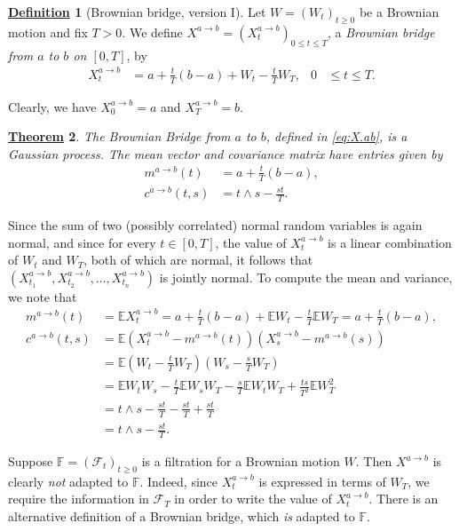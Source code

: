 \documentclass[12pt]{book}
\numberwithin{equation}{chapter}
\theoremstyle{plain}
\newtheorem{theorem}{\underline{Theorem}}
\numberwithin{theorem}{section}
\theoremstyle{definition}
\newtheorem{definition}[theorem]{\underline{Definition}}
\numberwithin{exercise}{chapter}
\let\oldendproof\endproof
\renewenvironment{proof}[1][\proofname]{%
  \oldproof[\scshape\underline{#1}]%
}{\oldendproof}
\newcommand{\<}{\langle}
\renewcommand{\>}{\rangle}
\renewcommand{\(}{\left(}
\renewcommand{\)}{\right)}
\renewcommand{\[}{\left[}
\renewcommand{\]}{\right]}
\newcommand\Eb{\mathds{E}}
\newcommand\Fb{\mathds{F}}
\newcommand\Fc{\mathscr{F}}
\begin{document}
\begin{definition}[Brownian bridge, version I]
\label{def:bridge.bm}
Let $W=(W_t)_{t \geq 0}$ be a Brownian motion and fix $T>0$.  We define $X^{a \to b} = (X_t^{a \to b})_{0 \leq t \leq T}$, a \emph{Brownian bridge from $a$ to $b$ on $[0,T]$}, by
\begin{align}
X_t^{a \to b}
	&=	a + \frac{t}{T}(b-a) + W_t - \frac{t}{T} W_T , &
0
	&\leq t \leq T . \label{eq:X.ab}
\end{align}
\end{definition}

\noindent
Clearly, we have $X_0^{a \to b} = a$ and $X_T^{a \to b} = b$.

\begin{theorem}
The Brownian Bridge from $a$ to $b$, defined in \eqref{eq:X.ab}, is a Gaussian process.  The mean vector and covariance matrix have entries given by
\begin{align}
m^{a \to b}(t)
	&=	a + \frac{t}{T}(b-a) , \\
c^{a \to b}(t,s)
	&=	t \wedge s - \frac{s t}{T} .
\end{align}
\end{theorem}

\begin{proof}
Since the sum of two (possibly correlated) normal random variables is again normal, and
since for every $t \in [0,T]$, the value of $X_t^{a \to b}$ is a linear combination of $W_t$ and $W_T$, both of which are normal,
it follows that $(X_{t_1}^{a \to b},X_{t_2}^{a \to b},\ldots,X_{t_n}^{a \to b})$ is jointly normal.
To compute the mean and variance, we note that
\begin{align}
m^{a \to b}(t)
	&=	\Eb X_t^{a \to b}
	=		a + \frac{t}{T}(b-a) + \Eb W_t - \frac{t}{T} \Eb W_T
	=		a + \frac{t}{T}(b-a) , \\
c^{a \to b}(t,s)
	&=	\Eb \( X_t^{a \to b} - m^{a \to b}(t) \) \( X_s^{a \to b} - m^{a \to b}(s) \) \\
	&=	\Eb \( W_t - \frac{t}{T} W_T \) \( W_s - \frac{s}{T} W_T \) \\
	&=	\Eb W_t W_s - \frac{t}{T} \Eb W_s W_T - \frac{s}{T} \Eb W_t W_T + \frac{ts}{T^2} \Eb W_T^2 \\
	&=	t \wedge s - \frac{st}{T} - \frac{st}{T} + \frac{st}{T} \\
	&=	t \wedge s - \frac{st}{T} .
\end{align}
\end{proof}

\noindent
Suppose $\Fb=(\Fc_t)_{t \geq 0}$ is a filtration for a Brownian motion $W$.  Then $X^{a \to b}$ is clearly \emph{not} adapted to $\Fb$.  Indeed, since $X_t^{a \to b}$ is expressed in terms of $W_T$, we require the information in $\Fc_T$ in order to write the value of $X_t^{a \to b}$.  There is an alternative definition of a Brownian bridge, which \emph{is} adapted to $\Fb$.
\end{document}

